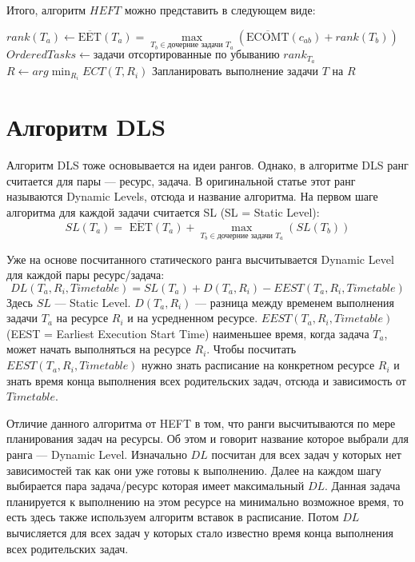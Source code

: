 \begin{spacing}{1.5}
Итого, алгоритм $HEFT$ можно представить в следующем виде:


\begin{algorithmic}
\STATE $rank(T_a) \leftarrow \overline{\mbox{EET}}(T_a) = \max\limits_{T_b \in \text{дочерние задачи $T_a$}}(\overline{\mbox{ECOMT}} (c_{ab}) + rank (T_b))$
\ENDFOR
\STATE $OrderedTasks \leftarrow \text{задачи отсортированные по убыванию $rank_{T_a}$}$
\STATE $R \leftarrow arg\min_{R_i} ECT(T, R_i)$
\STATE Запланировать выполнение задачи $T$ на $R$
\ENDFOR
\end{algorithmic}

\newpage
\section*{Алгоритм DLS}

Алгоритм DLS тоже основывается на идеи рангов. Однако, в алгоритме DLS ранг считается для пары --- ресурс, задача. В оригинальной статье этот ранг называются Dynamic Levels, отсюда и название алгоритма. На первом шаге алгоритма для каждой задачи считается SL (SL = Static Level):
$$
SL(T_a) = \overline{\mbox{ EET}}(T_a) + \max_{T_b \in \text{дочерние задачи $T_a$}}(SL (T_b))
$$

Уже на основе посчитанного статического ранга высчитывается Dynamic Level для каждой пары ресурс/задача:
$$
DL(T_a, R_i, Timetable) = SL(T_a) + D(T_a, R_i) - EEST(T_a, R_i, Timetable)
$$
Здесь $SL$ --- Static Level. $D(T_a, R_i)$ --- разница между временем выполнения задачи $T_a$ на ресурсе $R_i$ и на усредненном ресурсе. $EEST(T_a, R_i, Timetable)$ (EEST = Earliest Execution Start Time) наименьшее время, когда задача $T_a$, может начать выполняться на ресурсе $R_i$. Чтобы посчитать $EEST(T_a, R_i, Timetable)$ нужно знать расписание на конкретном ресурсе $R_i$ и знать время конца выполнения всех родительских задач,  отсюда и зависимость от $Timetable$. 

Отличие данного алгоритма от HEFT в том, что ранги высчитываются по мере планирования задач на ресурсы. Об этом и говорит название которое выбрали для ранга --- Dynamic Level. Изначально $DL$ посчитан для всех задач у которых нет зависимостей так как они уже готовы к выполнению. Далее на каждом шагу выбирается пара задача/ресурс которая имеет максимальный $DL$. Данная задача планируется к выполнению на этом ресурсе на минимально возможное время, то есть здесь также используем алгоритм вставок в расписание. Потом $DL$ вычисляется для всех задач у которых стало известно время конца выполнения всех родительских задач.


\end{spacing}
